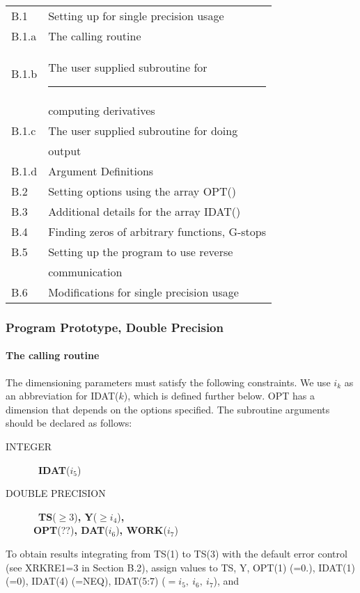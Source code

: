 \documentclass[twoside]{MATH77}
\begin{document}
\begin{tabular*}{3.3in}{@{}l@{~~}l}
B.1 & \hspace{-20pt} Setting up for single precision usage\dotfill
\pageref{PPSP}\\
\quad B.1.a & The calling routine\dotfill \pageref{Calling}\\
\quad B.1.b & The user supplied subroutine for\rule{.9in}{0pt}\\
 & computing derivatives\dotfill \pageref{DXRK8F}\\
\quad B.1.c & The user supplied subroutine for doing\\
 & output\dotfill \pageref{DXRK8O}\\
\quad B.1.d & Argument Definitions\dotfill \pageref{ArgDefs}\\
B.2 & \hspace{-20pt} Setting options using the array OPT()\dotfill
\pageref{OPT}\\
B.3 & \hspace{-20pt}Additional details for the array IDAT() \dotfill
\pageref{IDAT}\\
B.4 & \hspace{-20pt} Finding zeros of arbitrary functions,
G-stops\dotfill \pageref{GStops}\\
B.5 & \hspace{-20pt} Setting up the program to use reverse\\
& \hspace{-20pt} communication\dotfill \pageref{RevCom}\\
B.6 & \hspace{-20pt} Modifications for single precision usage\dotfill
\pageref{Sngl}\\
\end{tabular*}

\subsubsection{Program Prototype, Double Precision\label{PPSP}}

\paragraph{The calling routine\label{Calling}}

The dimensioning parameters must satisfy the following constraints.
We use $i_k$ as an abbreviation for IDAT($k$), which is defined further
below.  OPT has a dimension that depends on the options
specified.
The subroutine arguments should be declared as follows: \vspace{-5pt}
\begin{description}
\item[INTEGER]  \ {\bf IDAT}($i_5$)
\item[DOUBLE PRECISION] \ {\bf TS}($\geq 3$){\bf, Y}($\geq i_4$){\bf,\\
 OPT}(??){\bf, DAT}($i_6$){\bf, WORK}($i_7$)
\end{description}
To obtain results integrating from TS(1) to TS(3) with the default error
control (see XRKRE1=3 in Section B.2), assign values to TS, Y,
OPT(1) (=0.), IDAT(1) (=0), IDAT(4) (=NEQ), IDAT(5:7) ($= i_5,\ i_6,\
i_7$), and
\end{document}

